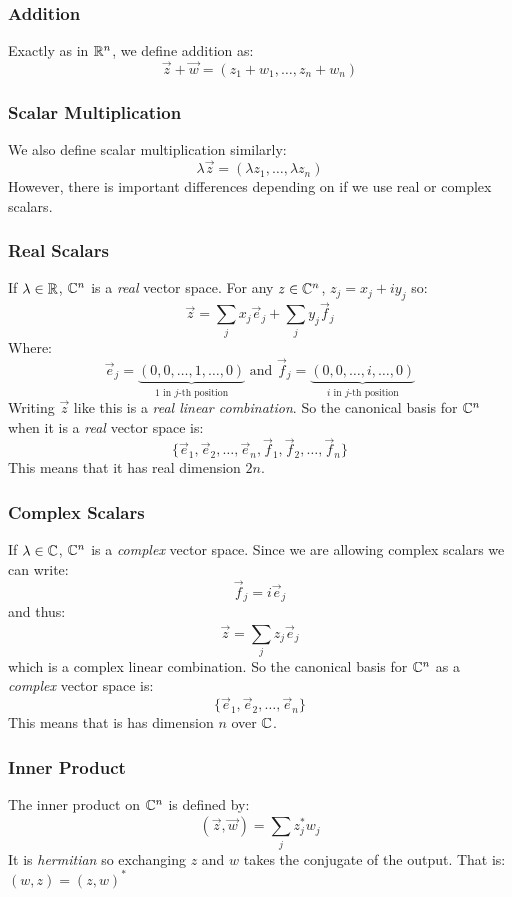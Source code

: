 \documentclass[../main.tex]{subfiles}
\begin{document}
\subsubsection{Addition}
Exactly as in $\mathbb{R}^{n}$, we define addition as:
\[
  \vec{z} + \vec{w} = (z_1 + w_1, \ldots, z_n + w_n)
\]
\subsubsection{Scalar Multiplication}
We also define scalar multiplication similarly:
\[
  \lambda \vec{z} = (\lambda z_1, \ldots, \lambda z_n)
\]
However, there is important differences depending on if we use real or complex scalars.
\subsubsection{Real Scalars}
If $\lambda \in \mathbb{R}$, $\mathbb{C}^{n}$ is a \textit{real} vector space.
For any $z \in \mathbb{C}^{n}$, $z_j = x_j + iy_j$ so:
\[
  \vec{z} = \sum_{j}^{} x_j \vec{e}_j + \sum_{j}^{} y_j \vec{f}_j
\]
Where:
\[
  \vec{e}_j = \underbrace{(0, 0, \ldots, 1, \ldots, 0)}_{\text{1 in $j$-th position}} \text{ and }
  \vec{f}_j = \underbrace{(0, 0, \ldots, i, \ldots, 0)}_{\text{$i$ in $j$-th position}}
\]
Writing $\vec{z}$ like this is a \textit{real linear combination}.
So the canonical basis for $\mathbb{C}^{n}$ when it is a \textit{real} vector space is:
\[
  \{\vec{e}_1, \vec{e}_2, \ldots, \vec{e}_n, \vec{f}_1, \vec{f}_2, \ldots, \vec{f}_n\}
\]
This means that it has real dimension $2n$.
\subsubsection{Complex Scalars}
If $\lambda \in \mathbb{C}$, $\mathbb{C}^{n}$ is a \textit{complex} vector space.
Since we are allowing complex scalars we can write:
\[
  \vec{f}_j = i \vec{e}_j
\]
and thus:
\[
  \vec{z} = \sum_{j}^{} z_j \vec{e}_j
\]
which is a complex linear combination.
So the canonical basis for $\mathbb{C}^{n}$ as a \textit{complex} vector space is:
\[
  \{\vec{e}_1, \vec{e}_2, \ldots, \vec{e}_n\}
\]
This means that is has dimension $n$ over $\mathbb{C}$.
\subsubsection{Inner Product}
The inner product on $\mathbb{C}^{n}$ is defined by:
\[
  (\vec{z}, \vec{w}) = \sum_{j}^{} z^{*}_{j} w_j
\]
It is \textit{hermitian} so exchanging $z$ and $w$ takes the conjugate of the output. That is: $(w, z) = (z, w)^{*}$
\end{document}
